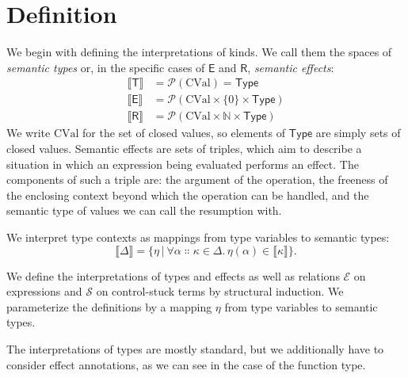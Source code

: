 \documentclass[a4paper, 12pt]{report}
\newcommand{\E}{\mathcal{E}}
\renewcommand{\S}{\mathcal{S}}
\newcommand{\kT}{\mathsf{T}}
\newcommand{\kE}{\mathsf{E}}
\newcommand{\kR}{\mathsf{R}}
\newcommand{\+}{\enspace}
\begin{document}
\section{Definition}

We begin with defining the interpretations of kinds.
We call them the spaces of \textit{semantic types} or,
in the specific cases of $\kE$ and $\kR$, \textit{semantic effects}:
\begin{align*}
	⟦\kT⟧ &= \mathcal{P}(\textrm{CVal}) = \mathsf{Type}\\
	⟦\kE⟧ &= \mathcal{P}(\textrm{CVal}×\{0\}×\mathsf{Type}) \\
	⟦\kR⟧ &= \mathcal{P}(\textrm{CVal}×ℕ×\mathsf{Type})
\end{align*}
We write $\textrm{CVal}$ for the set of closed values, so
elements of $\mathsf{Type}$ are simply sets of closed values.
Semantic effects are sets of triples, which aim to describe a situation
in which an expression being evaluated performs an effect.
The components of such a triple are:
the argument of the operation,
the freeness of the enclosing context beyond which the operation can be handled,
and the semantic type of values we can call the resumption with.

We interpret type contexts as mappings from type variables to semantic types:
$$⟦Δ⟧ = \{ η │ ∀α∷κ∈Δ.\,η(α) ∈ ⟦κ⟧ \}.$$

We define the interpretations of types and effects as well as
relations $\E$ on expressions and $\S$ on control-stuck terms by structural induction.
We parameterize the definitions by a mapping $η$ from type variables to
semantic types.

The interpretations of types are mostly standard,
but we additionally have to consider effect annotations,
as we can see in the case of the function type.
\end{document}
